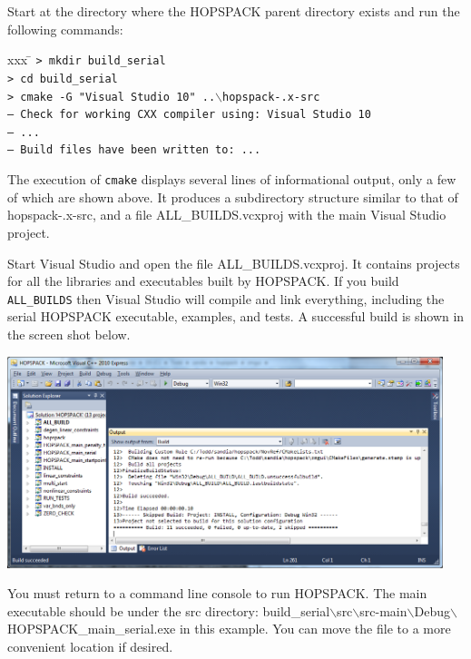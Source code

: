 Start at the directory where the HOPSPACK parent directory exists and
run the following commands:
\vspace{-11pt}
\begin{tabbing}
  xxx \= \kill
  \> {\tt > mkdir build\_serial} \\
  \> {\tt > cd build\_serial} \\
  \> {\tt > cmake -G "Visual Studio 10" ..$\backslash$hopspack-\HOPSVER.x-src} \\
  \> {\tt -- Check for working CXX compiler using: Visual Studio 10} \\
  \> {\tt -- ...} \\
  \> {\tt -- Build files have been written to: ...}
\end{tabbing}
\vspace{-11pt}
The execution of {\tt cmake} displays several lines of informational output,
only a few of which are shown above.
It produces a subdirectory structure similar to that of
{\sf hopspack-\HOPSVER.x-src},
and a file {\sf ALL\_BUILDS.vcxproj} with the main Visual Studio project.

Start Visual Studio and open the file {\sf ALL\_BUILDS.vcxproj}.  It contains
projects for all the libraries and executables built by HOPSPACK.
If you build {\tt ALL\_BUILDS} then Visual Studio will compile and link
everything, including the serial HOPSPACK executable, examples, and tests.
A successful build is shown in the screen shot below.

\begin{center}
\includegraphics[width=5.0in]{winmsvc_build.png}
\end{center}

You must return to a command line console to run HOPSPACK.
The main executable should be under the {\sf src} directory:
{\sf build\_serial$\backslash$src$\backslash$src-main$\backslash$Debug$\backslash$HOPSPACK\_main\_serial.exe} in this example.  You can move the file to a
more convenient location if desired.

